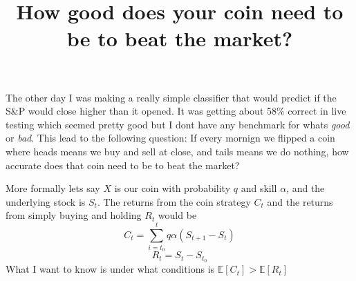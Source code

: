 \documentclass[11pt]{article}
\title{How good does your coin need to be to beat the market?}
\begin{document}
\maketitle

The other day I was making a really simple classifier that would predict if the S\&P would close higher than it opened.
It was getting about 58\% correct in live testing which seemed pretty good but I dont have any benchmark for whats \emph{good} or \emph{bad}. This lead to the following question: If every mornign we flipped a coin where heads means we buy and sell at close, and tails means we do nothing, how accurate does that coin need to be to beat the market?

More formally lets say $X$ is our coin with probability $q$ and skill $\alpha$, and the underlying stock is $S_t$. The returns from the coin strategy $C_t$ and the returns from simply buying and holding $R_t$ would be
\begin{equation*}
    C_t = \sum_{i=t_0}^{t} q\alpha (S_{t+1} - S_{t})
\end{equation*}
\begin{equation*}
    R_t = S_{t} - S_{t_0}
\end{equation*}
What I want to know is under what conditions is $\mathbb{E}[C_t] > \mathbb{E}[R_t]$
\end{document}
